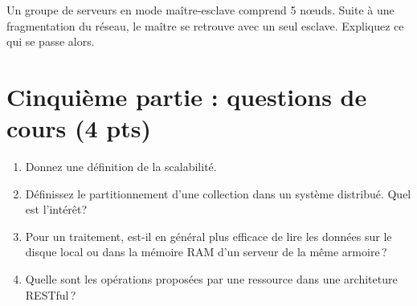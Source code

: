 \documentclass[11pt,a4paper]{article}
\begin{document}
Un groupe de serveurs en mode maître-esclave comprend 5 n{\oe}uds. Suite à une fragmentation
du réseau, le maître se retrouve  avec un seul esclave.  Expliquez ce qui se passe alors.

\section*{Cinquième partie : questions de cours (4 pts)}


\begin{enumerate}
   \item Donnez une définition de la scalabilité.
   \item Définissez le partitionnement d'une collection dans un système distribué. Quel est l'intérêt?
   \item Pour un traitement, est-il en général plus efficace de lire les données sur le disque local
      ou dans la mémoire RAM d'un serveur de la même armoire\,?
    \item Quelle sont les opérations proposées par une ressource dans une architeture RESTful\,?
\end{enumerate}
\end{document}
